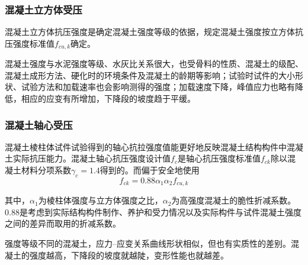 \documentclass{article}
\begin{document}
\subsubsection{混凝土立方体受压}
\par 混凝土立方体抗压强度是确定混凝土强度等级的依据，\gb{}规定混凝土强度按立方体抗压强度标准值$f_{cu,k}$确定。
\par 混凝土强度与水泥强度等级、水灰比关系很大，也受骨料的性质、混凝土的级配、混凝土成形方法、硬化时的环境条件及混凝土的龄期等影响；试验时试件的大小形状、试验方法和加载速率也会影响测得的强度；加载速度下降，峰值应力也略有降低，相应的应变有所增加，下降段的坡度趋于平缓。
\subsubsection{混凝土轴心受压}
\par 混凝土棱柱体试件试验得到的轴心抗拉强度值能更好地反映混凝土结构构件中混凝土实际抗压能力。混凝土轴心抗压强度设计值$f_c$是轴心抗压强度标准值$f_{ck}$除以混凝土材料分项系数$\gamma_c=1.4$得到的。而\gb{}偏于安全地使用
$$
      f_{ck} = 0.88 \alpha_1 \alpha_2 f_{cu,k}
$$
\par 其中，$\alpha_1$为棱柱体强度与立方体强度之比，$\alpha_2$为高强度混凝土的脆性折减系数。0.88是考虑到实际结构构件制作、养护和受力情况以及实际构件与试件混凝土强度之间的差异而取用的折减系数。
\begin{center}
\end{center}
\par 强度等级不同的混凝土，应力--应变关系曲线形状相似，但也有实质性的差别。混凝土的强度越高，下降段的坡度就越陡，变形性能也就越差。
\end{document}
